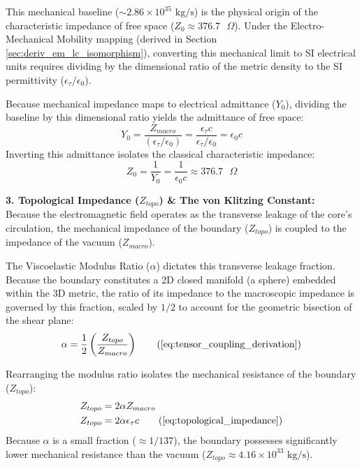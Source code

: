 This mechanical baseline ($\sim 2.86 \times 10^{35} \text{ kg/s}$) is the physical origin of the characteristic impedance of free space ($Z_0 \approx 376.7 \text{ } \Omega$). Under the Electro-Mechanical Mobility mapping (derived in Section \ref{sec:deriv_em_lc_isomorphism}), converting this mechanical limit to SI electrical units requires dividing by the dimensional ratio of the metric density to the SI permittivity ($\epsilon_\tau / \epsilon_0$). 

Because mechanical impedance maps to electrical admittance ($Y_0$), dividing the baseline by this dimensional ratio yields the admittance of free space:
\begin{equation}
    Y_0 = \frac{Z_{macro}}{(\epsilon_\tau / \epsilon_0)} = \frac{\epsilon_\tau c}{\epsilon_\tau / \epsilon_0} = \epsilon_0 c
\end{equation}
Inverting this admittance isolates the classical characteristic impedance:
\begin{equation}
    Z_0 = \frac{1}{Y_0} = \frac{1}{\epsilon_0 c} \approx 376.7 \text{ } \Omega
\end{equation}

\vspace{0.2 cm}


\textbf{3. Topological Impedance ($Z_{topo}$) \& The von Klitzing Constant:} \\
Because the electromagnetic field operates as the transverse leakage of the core's circulation, the mechanical impedance of the boundary ($Z_{topo}$) is coupled to the impedance of the vacuum ($Z_{macro}$). 

The Viscoelastic Modulus Ratio ($\alpha$) dictates this transverse leakage fraction. Because the boundary constitutes a 2D closed manifold (a sphere) embedded within the 3D metric, the ratio of its impedance to the macroscopic impedance is governed by this fraction, scaled by $1/2$ to account for the geometric bisection of the shear plane:
\begin{equation}
    \alpha = \frac{1}{2} \left( \frac{Z_{topo}}{Z_{macro}} \right) \tag{\ref{eq:tensor_coupling_derivation}}
\end{equation}

Rearranging the modulus ratio isolates the mechanical resistance of the boundary ($Z_{topo}$):
\begin{align}
    Z_{topo} &= 2 \alpha Z_{macro} \nonumber \\
    Z_{topo} &= 2 \alpha \epsilon_{\tau} c \tag{\ref{eq:topological_impedance}}
\end{align}
Because $\alpha$ is a small fraction ($\approx 1/137$), the boundary possesses significantly lower mechanical resistance than the vacuum ($Z_{topo} \approx 4.16 \times 10^{33} \text{ kg/s}$). 

